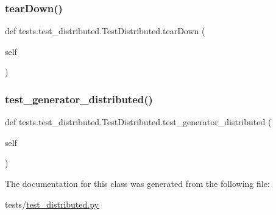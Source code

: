 \subsubsection{\texorpdfstring{tear\+Down()}{tearDown()}}
{\footnotesize\ttfamily def tests.\+test\+\_\+distributed.\+Test\+Distributed.\+tear\+Down (\begin{DoxyParamCaption}\item[{}]{self }\end{DoxyParamCaption})}

\mbox{\label{classtests_1_1test__distributed_1_1TestDistributed_ab483f9fbc8ee190aa9999994a211d0fe}} 
\subsubsection{\texorpdfstring{test\+\_\+generator\+\_\+distributed()}{test\_generator\_distributed()}}
{\footnotesize\ttfamily def tests.\+test\+\_\+distributed.\+Test\+Distributed.\+test\+\_\+generator\+\_\+distributed (\begin{DoxyParamCaption}\item[{}]{self }\end{DoxyParamCaption})}



The documentation for this class was generated from the following file\+:\begin{DoxyCompactItemize}
\item 
tests/\hyperlink{test__distributed_8py}{test\+\_\+distributed.\+py}\end{DoxyCompactItemize}
